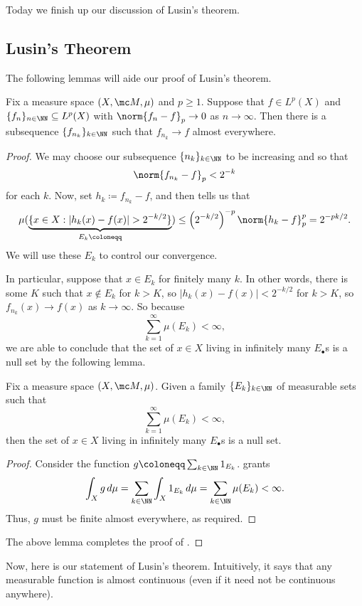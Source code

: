 \documentclass[../notes.tex]{subfiles}
\begin{document}
Today we finish up our discussion of Lusin's theorem.

\subsection{Lusin's Theorem}
The following lemmas will aide our proof of Lusin's theorem.
\begin{lemma} \label{lem:lusin-helper}
	Fix a measure space $(X,\mc M,\mu)$ and $p\ge1$. Suppose that $f\in L^p(X)$ and $\{f_n\}_{n\in\NN}\subseteq L^p(X)$ with $\norm{f_n-f}_p\to0$ as $n\to\infty$. Then there is a subsequence $\{f_{n_k}\}_{k\in\NN}$ such that $f_{n_k}\to f$ almost everywhere.
\end{lemma}
\begin{proof}
	We may choose our subsequence $\{n_k\}_{k\in\NN}$ to be increasing and so that
	\[\norm{f_{n_k}-f}_p<2^{-k}\]
	for each $k$. Now, set $h_k\coloneqq f_{n_k}-f$, and then  tells us that
	\[\mu(\underbrace{\{x\in X:\left|h_k(x)-f(x)\right|>2^{-k/2}\}}_{E_k\coloneqq})\le\left(2^{-k/2}\right)^{-p}\norm{h_k-f}_p^p=2^{-pk/2}.\]
	We will use these $E_k$ to control our convergence.

	In particular, suppose that $x\in E_k$ for finitely many $k$. In other words, there is some $K$ such that $x\notin E_k$ for $k>K$, so $\left|h_k(x)-f(x)\right|<2^{-k/2}$ for $k>K$, so $f_{n_k}(x)\to f(x)$ as $k\to\infty$. So because
	\[\sum_{k=1}^\infty\mu(E_k)<\infty,\]
	we are able to conclude that the set of $x\in X$ living in infinitely many $E_\bullet$s is a null set by the following lemma.
	\begin{lemma}
		Fix a measure space $(X,\mc M,\mu)$. Given a family $\{E_k\}_{k\in\NN}$ of measurable sets such that
		\[\sum_{k=1}^\infty\mu(E_k)<\infty,\]
		then the set of $x\in X$ living in infinitely many $E_\bullet$s is a null set.
	\end{lemma}
	\begin{proof}
		Consider the function $g\coloneqq\sum_{k\in\NN}1_{E_k}$.  grants
		\[\int_Xg\,d\mu=\sum_{k\in\NN}\int_X1_{E_k}\,d\mu=\sum_{k\in\NN}\mu(E_k)<\infty.\]
		Thus, $g$ must be finite almost everywhere, as required.
	\end{proof}
	The above lemma completes the proof of .
\end{proof}
Now, here is our statement of Lusin's theorem. Intuitively, it says that any measurable function is almost continuous (even if it need not be continuous anywhere).
\end{document}
